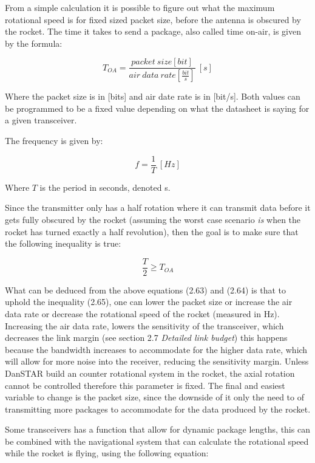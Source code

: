 From a simple calculation it is possible to figure out what the maximum rotational speed is for fixed sized packet size, before the antenna is obscured by the rocket. The time it takes to send a package, also called time on-air, is given by the formula:

\begin{equation}
    T_{OA} = \frac{packet\ size [bit]}{air\ data\ rate [\frac{bit}{s}]}\ [s]
\end{equation}

Where the packet size is in [bits] and air date rate is in [bit/s]. Both values can be programmed to be a fixed value depending on what the datasheet is saying for a given transceiver. 

The frequency is given by:

\begin{equation}
    f = \frac{1}{T}\ [Hz]
\end{equation}

Where $T$ is the period in seconds, denoted s.

Since the transmitter only has a half rotation where it can transmit data before it gets fully obscured by the rocket (assuming the worst case scenario \textit{is} when the rocket has turned exactly a half revolution), then the goal is to make sure that the following inequality is true:

\begin{equation}
    \frac{T}{2} \geq T_{OA}
\end{equation}

What can be deduced from the above equations (2.63) and (2.64) is that to uphold the inequality (2.65), one can lower the packet size or increase the air data rate or decrease the rotational speed of the rocket (measured in Hz). Increasing the air data rate, lowers the sensitivity of the transceiver, which decreases the link margin (see section 2.7 \textit{Detailed link budget}) this happens because the bandwidth increases to accommodate for the higher data rate, which will allow for more noise into the receiver, reducing the sensitivity margin. Unless DanSTAR build an counter rotational system in the rocket, the axial rotation cannot be controlled therefore this parameter is fixed. The final and easiest variable to change is the packet size, since the downside of it only the need to of transmitting more packages to accommodate for the data produced by the rocket. 

Some transceivers has a function that allow for dynamic package lengths, this can be combined with the navigational system that can calculate the rotational speed while the rocket is flying, using the following equation:

